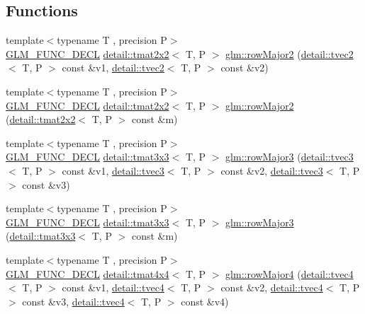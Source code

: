 \subsection*{Functions}
\begin{DoxyCompactItemize}
\item 
{\footnotesize template$<$typename T , precision P$>$ }\\\hyperlink{setup_8hpp_ab2d052de21a70539923e9bcbf6e83a51}{G\+L\+M\+\_\+\+F\+U\+N\+C\+\_\+\+D\+E\+CL} \hyperlink{structglm_1_1detail_1_1tmat2x2}{detail\+::tmat2x2}$<$ T, P $>$ \hyperlink{group__gtx__matrix__major__storage_ga63d72819ad07f4f875a0565f1462652b}{glm\+::row\+Major2} (\hyperlink{structglm_1_1detail_1_1tvec2}{detail\+::tvec2}$<$ T, P $>$ const \&v1, \hyperlink{structglm_1_1detail_1_1tvec2}{detail\+::tvec2}$<$ T, P $>$ const \&v2)
\item 
{\footnotesize template$<$typename T , precision P$>$ }\\\hyperlink{setup_8hpp_ab2d052de21a70539923e9bcbf6e83a51}{G\+L\+M\+\_\+\+F\+U\+N\+C\+\_\+\+D\+E\+CL} \hyperlink{structglm_1_1detail_1_1tmat2x2}{detail\+::tmat2x2}$<$ T, P $>$ \hyperlink{group__gtx__matrix__major__storage_ga5e3cee7cdc09b9ebf0e072247a5eac54}{glm\+::row\+Major2} (\hyperlink{structglm_1_1detail_1_1tmat2x2}{detail\+::tmat2x2}$<$ T, P $>$ const \&m)
\item 
{\footnotesize template$<$typename T , precision P$>$ }\\\hyperlink{setup_8hpp_ab2d052de21a70539923e9bcbf6e83a51}{G\+L\+M\+\_\+\+F\+U\+N\+C\+\_\+\+D\+E\+CL} \hyperlink{structglm_1_1detail_1_1tmat3x3}{detail\+::tmat3x3}$<$ T, P $>$ \hyperlink{group__gtx__matrix__major__storage_gaacbbf46215dff1c3da9599916ba04a94}{glm\+::row\+Major3} (\hyperlink{structglm_1_1detail_1_1tvec3}{detail\+::tvec3}$<$ T, P $>$ const \&v1, \hyperlink{structglm_1_1detail_1_1tvec3}{detail\+::tvec3}$<$ T, P $>$ const \&v2, \hyperlink{structglm_1_1detail_1_1tvec3}{detail\+::tvec3}$<$ T, P $>$ const \&v3)
\item 
{\footnotesize template$<$typename T , precision P$>$ }\\\hyperlink{setup_8hpp_ab2d052de21a70539923e9bcbf6e83a51}{G\+L\+M\+\_\+\+F\+U\+N\+C\+\_\+\+D\+E\+CL} \hyperlink{structglm_1_1detail_1_1tmat3x3}{detail\+::tmat3x3}$<$ T, P $>$ \hyperlink{group__gtx__matrix__major__storage_gafb5e7381b2451a85db394c457c284fb7}{glm\+::row\+Major3} (\hyperlink{structglm_1_1detail_1_1tmat3x3}{detail\+::tmat3x3}$<$ T, P $>$ const \&m)
\item 
{\footnotesize template$<$typename T , precision P$>$ }\\\hyperlink{setup_8hpp_ab2d052de21a70539923e9bcbf6e83a51}{G\+L\+M\+\_\+\+F\+U\+N\+C\+\_\+\+D\+E\+CL} \hyperlink{structglm_1_1detail_1_1tmat4x4}{detail\+::tmat4x4}$<$ T, P $>$ \hyperlink{group__gtx__matrix__major__storage_gaba5dbb8fa29fcf57c80daf43ca7cf9db}{glm\+::row\+Major4} (\hyperlink{structglm_1_1detail_1_1tvec4}{detail\+::tvec4}$<$ T, P $>$ const \&v1, \hyperlink{structglm_1_1detail_1_1tvec4}{detail\+::tvec4}$<$ T, P $>$ const \&v2, \hyperlink{structglm_1_1detail_1_1tvec4}{detail\+::tvec4}$<$ T, P $>$ const \&v3, \hyperlink{structglm_1_1detail_1_1tvec4}{detail\+::tvec4}$<$ T, P $>$ const \&v4)

\end{DoxyCompactItemize}

